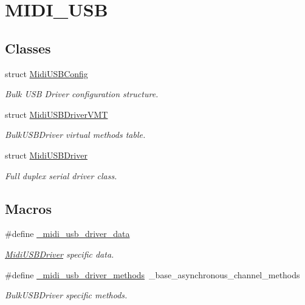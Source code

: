 \hypertarget{group__MIDI__USB}{}\section{M\+I\+D\+I\+\_\+\+U\+SB}
\label{group__MIDI__USB}
\subsection*{Classes}
\begin{DoxyCompactItemize}
\item 
struct \hyperlink{structMidiUSBConfig}{Midi\+U\+S\+B\+Config}
\begin{DoxyCompactList}\small\item\em Bulk U\+SB Driver configuration structure. \end{DoxyCompactList}\item 
struct \hyperlink{structMidiUSBDriverVMT}{Midi\+U\+S\+B\+Driver\+V\+MT}
\begin{DoxyCompactList}\small\item\em {\ttfamily Bulk\+U\+S\+B\+Driver} virtual methods table. \end{DoxyCompactList}\item 
struct \hyperlink{structMidiUSBDriver}{Midi\+U\+S\+B\+Driver}
\begin{DoxyCompactList}\small\item\em Full duplex serial driver class. \end{DoxyCompactList}\end{DoxyCompactItemize}
\subsection*{Macros}
\begin{DoxyCompactItemize}
\item 
\#define \hyperlink{group__MIDI__USB_ga8cfb956039dff17bc67f80137c28bcbb}{\+\_\+midi\+\_\+usb\+\_\+driver\+\_\+data}
\begin{DoxyCompactList}\small\item\em {\ttfamily \hyperlink{structMidiUSBDriver}{Midi\+U\+S\+B\+Driver}} specific data. \end{DoxyCompactList}\item 
\#define \hyperlink{group__MIDI__USB_gaed42fc468f948c258e107f51e5f89a07}{\+\_\+midi\+\_\+usb\+\_\+driver\+\_\+methods}~\+\_\+base\+\_\+asynchronous\+\_\+channel\+\_\+methods\hypertarget{group__MIDI__USB_gaed42fc468f948c258e107f51e5f89a07}{}\label{group__MIDI__USB_gaed42fc468f948c258e107f51e5f89a07}

\begin{DoxyCompactList}\small\item\em {\ttfamily Bulk\+U\+S\+B\+Driver} specific methods. \end{DoxyCompactList}\end{DoxyCompactItemize}
